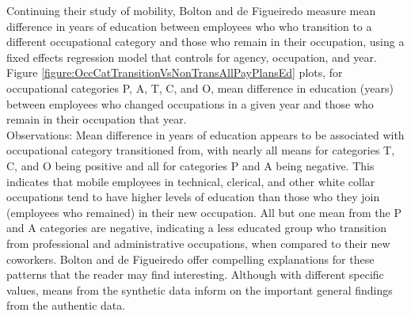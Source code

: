\documentclass[10pt, letterpaper]{article}
\begin{document}
\begin{spacing}{1.0}
Continuing their study of mobility, Bolton and de Figueiredo measure mean difference in years of education between employees who who transition to a different occupational category and those who remain in their occupation, using a fixed effects regression model that controls for agency, occupation, and year.  Figure \ref{figure:OccCatTransitionVsNonTransAllPayPlansEd} plots, for occupational categories P, A, T, C, and O, mean difference in education (years) between employees who changed occupations in a given year and those who remain in their occupation that year.\\

Observations:  Mean difference in years of education appears to be associated with occupational category transitioned from, with nearly all means for categories T, C, and O being positive  and all for categories P and A being negative.  This indicates that mobile employees in technical, clerical, and other white collar occupations tend to have higher levels of education than those who they join (employees who remained) in their new occupation.  All but one mean from the P and A categories are negative, indicating a less educated group who transition from professional and administrative occupations, when compared to their new coworkers.  Bolton and de Figueiredo offer compelling explanations for these patterns that the reader may find interesting.  Although with different specific values, means from the synthetic data inform on the important general findings from the authentic data.\\


\end{spacing}
\end{document}
